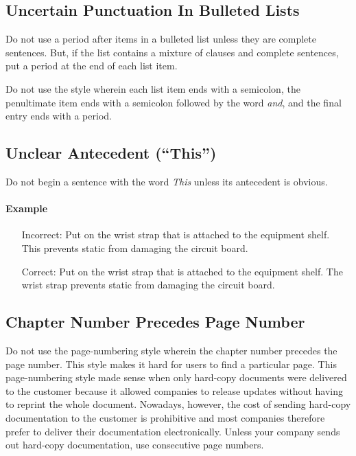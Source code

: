 \documentclass[12pt]{article}
\begin{document}
\subsection{Uncertain Punctuation In Bulleted Lists}
Do not use a period after items in a bulleted list unless they are complete sentences. But, if the list contains a mixture of clauses and complete sentences, put a period at the end of each list item.

Do not use the style wherein each list item ends with a semicolon, the penultimate item ends with a semicolon followed by the word \emph{and}, and the final entry ends with a period.

\subsection{Unclear Antecedent (``This'')}

Do not begin a sentence with the word \emph{This} unless its antecedent is obvious.

\paragraph{Example}
\begin{itemize} \itemsep -2pt
	\item[Incorrect:] Put on the wrist strap that is attached to the equipment shelf. This prevents static from damaging the circuit board.
	\item[Correct:] Put on the wrist strap that is attached to the equipment shelf. The wrist strap prevents static from damaging the circuit board.
\end{itemize}

\subsection{Chapter Number Precedes Page Number}
Do not use the page-numbering style wherein the chapter number precedes the page number. This style makes it hard for users to find a particular page. This page-numbering style made sense when only hard-copy documents were delivered to the customer because it allowed companies to release updates without having to reprint the whole document. Nowadays, however, the cost of sending hard-copy documentation to the customer is prohibitive and most companies therefore prefer to deliver their documentation electronically. Unless your company sends out hard-copy documentation, use consecutive page numbers.
\end{document}
